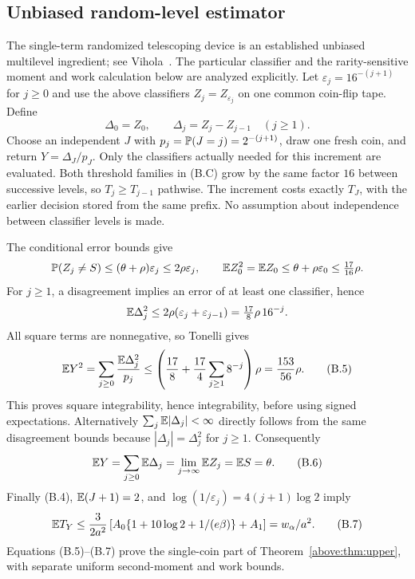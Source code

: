 \subsection{Unbiased random-level estimator}
The single-term randomized telescoping device is an established unbiased
multilevel ingredient; see Vihola~\cite[Theorem 3]{vihola}. The particular classifier and
the rarity-sensitive moment and work calculation below are analyzed explicitly.
Let $\varepsilon_j=16^{-(j+1)}$ for $j\ge0$ and use the above classifiers
$Z_j=Z_{\varepsilon_j}$ on one common coin-flip tape. Define
\[
 \Delta_0=Z_0,\qquad \Delta_j=Z_j-Z_{j-1}\quad(j\ge1).
\]
Choose an independent $J$ with $p_j=\mathbb P(J=j)=2^{-(j+1)}$, draw one fresh coin,
and return $Y=\Delta_J/p_J$. Only the classifiers actually needed for this
increment are evaluated. Both threshold families in (B.C) grow by the same
factor $16$ between successive levels, so $T_j\ge T_{j-1}$ pathwise. The
increment costs exactly $T_J$, with the earlier decision stored from the same
prefix. No assumption about independence between classifier levels is made.

The conditional error bounds give
\[
 \mathbb P(Z_j\ne S)\le (\theta+\rho)\varepsilon_j\le2\rho\varepsilon_j,
 \qquad \mathbb E Z_0^2=\mathbb E Z_0\le\theta+\rho\varepsilon_0\le\tfrac{17}{16}\rho.
\]
For $j\ge1$, a disagreement implies an error of at least one classifier, hence
\[
 \mathbb E\Delta_j^2\le2\rho(\varepsilon_j+\varepsilon_{j-1})
                    =\tfrac{17}{8}\rho\,16^{-j}.
\]
All square terms are nonnegative, so Tonelli gives
\[
 \mathbb E Y^2=\sum_{j\ge0}\frac{\mathbb E\Delta_j^2}{p_j}
 \le\left(\frac{17}{8}+\frac{17}{4}\sum_{j\ge1}8^{-j}\right)\rho
 =\frac{153}{56}\rho.                                  \tag{B.5}
\]
This proves square integrability, hence integrability, before using signed
expectations. Alternatively $\sum_j\mathbb E|\Delta_j|<\infty$ directly follows
from the same disagreement bounds because $|\Delta_j|=\Delta_j^2$ for $j\ge1$.
Consequently
\[
 \mathbb E Y=\sum_{j\ge0}\mathbb E\Delta_j
       =\lim_{j\to\infty}\mathbb E Z_j=\mathbb E S=\theta.             \tag{B.6}
\]
Finally (B.4), $\mathbb E(J+1)=2$, and $\log(1/\varepsilon_j)=4(j+1)\log2$ imply
\[
 \mathbb E T_Y\le\frac3{2a^2}
 \left[A_0\{1+10\log2+1/(e\beta)\}+A_1\right]
 =w_\alpha/a^2.                                         \tag{B.7}
\]
Equations (B.5)--(B.7) prove the single-coin part of Theorem~\ref{above:thm:upper}, with
separate uniform second-moment and work bounds.

